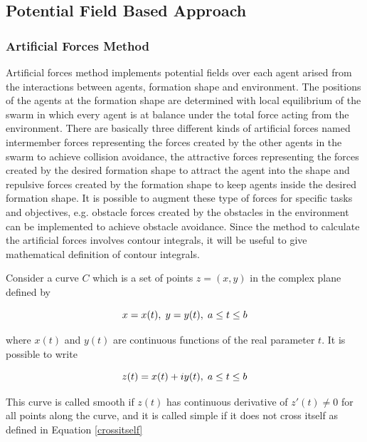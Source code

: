 \subsection{Potential Field Based Approach}

\subsubsection{Artificial Forces Method} \label{Artificial Forces Ref} \label{Artificial_forces_ref}
Artificial forces method implements potential fields over each agent arised from the interactions between agents, formation shape and environment. The positions of the agents at the formation shape  are determined with local equilibrium of the swarm in which every agent is at balance under the total force acting from the environment. There are basically three different kinds of artificial forces named intermember forces representing the forces created by the other agents in the swarm to achieve collision avoidance, the attractive forces representing the forces created by the desired formation shape to attract the agent into the shape and repulsive forces created by the formation shape to keep agents inside the desired formation shape. It is possible to augment these type of forces for specific tasks and objectives, e.g. obstacle forces created by the obstacles in the environment can be implemented to achieve obstacle avoidance.
Since the method to calculate the artificial forces involves contour integrals, it will be useful to give mathematical definition of contour integrals.
		
Consider a curve $C$ which is a set of points $z = (x,y)$ in the complex plane defined by \cite{wiki_contour}

\begin{equation}
x = x(t),   \hspace{0.1cm} y = y(t),  \hspace{0.1cm} a\leq t \leq b
\end{equation}

where $x(t)$ and $y(t)$ are continuous functions of the real parameter $t$.  It is possible to write
		
\begin{equation}
z(t) = x(t)+iy(t),   \hspace{0.1cm} a\leq t \leq b
\end{equation}
		
This curve is called smooth if $z(t)$ has continuous derivative of $z'(t) \neq 0$ for all points along the curve, and it is called simple if it does not cross itself as defined in Equation \ref{crossitself}

